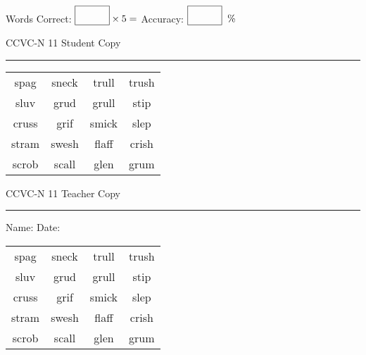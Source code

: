 \documentclass{memoir}
\begin{document}
\small

Words Correct: $\fbox{\phantom{\huge 100}} \times 5 = $ Accuracy: $\fbox{\phantom{\huge 100}}\;\; \%$ 

\vfill

\newpage


\footnotesize \noindent
CCVC-N 11 \hfill Student Copy
\smallskip
\hrule

\Large

\setlength{\tabcolsep}{14pt}
\def\arraystretch{3}

{\selectfont


\begin{vplace}[0.5]
\begin{center}
\begin{tabular}{cccc}
spag          & sneck & trull & trush \\
sluv & grud & grull            & stip \\
cruss & grif      & smick & slep            \\
stram & swesh & flaff & crish \\
scrob & scall & glen & grum       \\
\end{tabular}
\end{center}
\end{vplace}

}

\newpage

\footnotesize \noindent
CCVC-N 11 \hfill Teacher Copy
\smallskip
\hrule

\small

\vfill

\noindent
Name: \underline{\hspace{1.75in}} \hfill Date: \underline{\hspace{1in}}

\Large

{\selectfont


\begin{vplace}[0.5]
\begin{center}
\begin{tabular}{cccc}
spag          & sneck & trull & trush \\
sluv & grud & grull            & stip \\
cruss & grif      & smick & slep            \\
stram & swesh & flaff & crish \\
scrob & scall & glen & grum       \\
\end{tabular}
\end{center}
\end{vplace}



}
\end{document}
